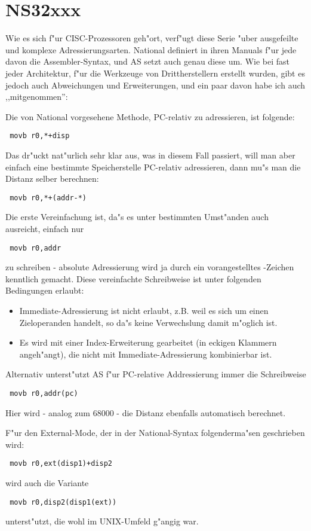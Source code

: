 \documentclass[12pt,a4paper,twoside]{report}
\begin{document}

\section{NS32xxx}

Wie es sich f"ur CISC-Prozessoren geh"ort, verf"ugt diese Serie "uber ausgefeilte
und komplexe Adressierungsarten.  National definiert in ihren Manuals f"ur
jede davon die Assembler-Syntax, und AS setzt auch genau diese um.  Wie bei
fast jeder Architektur, f"ur die Werkzeuge von Drittherstellern erstellt wurden,
gibt es jedoch auch Abweichungen und Erweiterungen, und ein paar davon habe
ich auch ,,mitgenommen'':

Die von National vorgesehene Methode, PC-relativ zu adressieren, ist folgende:
\begin{verbatim}
 movb r0,*+disp
\end{verbatim}
Das dr"uckt nat"urlich sehr klar aus, was in diesem Fall passiert, will man aber
einfach eine bestimmte Speicherstelle PC-relativ adressieren, dann mu"s man die
Distanz selber berechnen:
\begin{verbatim}
 movb r0,*+(addr-*)
\end{verbatim}
Die erste Vereinfachung ist, da"s es unter bestimmten Umst"anden auch ausreicht,
einfach nur
\begin{verbatim}
 movb r0,addr
\end{verbatim}
zu schreiben - absolute Adressierung wird ja durch ein vorangestelltes \@-Zeichen
kenntlich gemacht.  Diese vereinfachte Schreibweise ist unter folgenden Bedingungen
erlaubt:
\begin{itemize}
\item{Immediate-Adressierung ist nicht erlaubt, z.B. weil es sich um einen
      Zieloperanden handelt, so da"s keine Verwechslung damit m"oglich ist.}
\item{Es wird mit einer Index-Erweiterung gearbeitet (in eckigen Klammern angeh"angt),
      die nicht mit Immediate-Adressierung kombinierbar ist.}
\end{itemize}
Alternativ unterst"utzt AS f"ur PC-relative Addressierung immer die Schreibweise
\begin{verbatim}
 movb r0,addr(pc)
\end{verbatim}
Hier wird - analog zum 68000 - die Distanz ebenfalls automatisch berechnet.

F"ur den External-Mode, der in der National-Syntax folgenderma"sen geschrieben
wird:
\begin{verbatim}
 movb r0,ext(disp1)+disp2
\end{verbatim}
wird auch die Variante
\begin{verbatim}
 movb r0,disp2(disp1(ext))
\end{verbatim}
unterst"utzt, die wohl im UNIX-Umfeld g"angig war.
\end{document}
